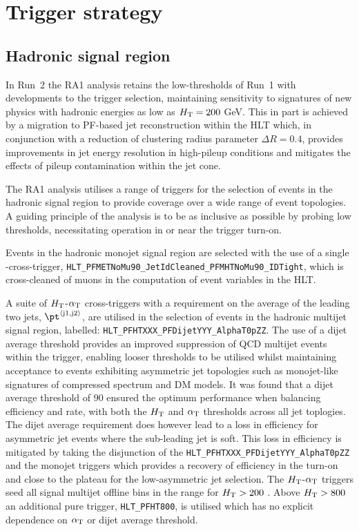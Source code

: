\section{Trigger strategy}
\label{sec:triggers}


\subsection{Hadronic signal region\label{sec:hadronic_signal_region}}

In Run~2 the RA1 analysis retains the low-thresholds of Run~1 with developments 
to the trigger selection, maintaining sensitivity to signatures of new physics with hadronic 
energies as low as $\mbox{$H_\text{T}$} = 200$ GeV. This in part is achieved by a migration to PF-based 
jet reconstruction within the HLT which, in conjunction with a reduction of clustering radius 
parameter $\Delta R = 0.4$, provides improvements in jet energy resolution in high-pileup 
conditions and mitigates the effects of pileup contamination within the jet cone.

The RA1 analysis utilises a range of triggers for the selection of events in the hadronic signal region
to provide coverage over a wide range of event topologies. A guiding principle of the analysis is to be as
inclusive as possible by probing low thresholds, necessitating operation in or near the trigger turn-on.

Events in the hadronic monojet signal region are selected with the use of a single \mht-\met cross-trigger, 
\verb!HLT_PFMETNoMu90_JetIdCleaned_PFMHTNoMu90_IDTight!, which is cross-cleaned of muons in the computation 
of event variables in the HLT. 

A suite of $\mbox{$H_\text{T}$}$-$\alpha_{\text{T}}$ cross-triggers 
with a requirement on the average \pt of the leading two jets, $\pt^{\rm \left<j1,j2\right>}$, 
are utilised in the selection of events in the hadronic multijet signal region, labelled: 
\verb!HLT_PFHTXXX_PFDijetYYY_AlphaT0pZZ!. The use of a dijet average threshold provides an improved 
suppression of QCD multijet events within the trigger,
enabling looser \alphat thresholds to be utilised whilst maintaining acceptance to events exhibiting asymmetric jet 
topologies such as monojet-like signatures of compressed spectrum and DM models. It was found that a dijet average
threshold of 90 \GeV ensured the optimum performance when balancing efficiency and rate, with both the $\mbox{$H_\text{T}$}$ and $\alpha_{\text{T}}$
thresholds across all jet toplogies. The dijet average requirement does however lead to a loss in efficiency for 
asymmetric jet events where the sub-leading jet is soft. This loss in efficiency is mitigated by taking the 
disjunction of the \verb!HLT_PFHTXXX_PFDijetYYY_AlphaT0pZZ! and the monojet triggers which provides a recovery 
of efficiency in the turn-on and close to the plateau for the low-\scalht asymmetric jet selection. 
The $\mbox{$H_\text{T}$}$-$\alpha_{\text{T}}$ triggers seed all signal multijet offline 
bins in the range for $\mbox{$H_\text{T}$} > 200$ \GeV. Above $\mbox{$H_\text{T}$} > 800$ an additional pure \scalht trigger, \verb!HLT_PFHT800!, 
is utilised which has no explicit dependence on $\alpha_{\text{T}}$ or dijet average threshold. 

